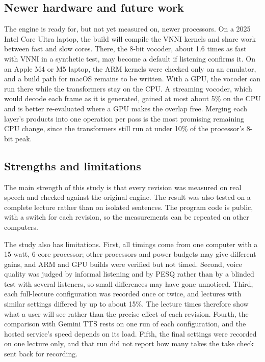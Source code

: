 \documentclass[11pt]{article}
\begin{document}
\hypertarget{newer-hardware-and-future-work}{%
\subsection{Newer hardware and future
work}\label{newer-hardware-and-future-work}}

The engine is ready for, but not yet measured on, newer processors. On a
2025 Intel Core Ultra laptop, the build will compile the VNNI kernels
and share work between fast and slow cores. There, the 8-bit vocoder,
about 1.6 times as fast with VNNI in a synthetic test, may become a
default if listening confirms it. On an Apple M4 or M5 laptop, the ARM
kernels were checked only on an emulator, and a build path for macOS
remains to be written. With a GPU, the vocoder can run there while the
transformers stay on the CPU. A streaming vocoder, which would decode
each frame as it is generated, gained at most about 5\% on the CPU and
is better re-evaluated where a GPU makes the overlap free. Merging each
layer's products into one operation per pass is the most promising
remaining CPU change, since the transformers still run at under 10\% of
the processor's 8-bit peak.

\hypertarget{strengths-and-limitations}{%
\subsection{Strengths and limitations}\label{strengths-and-limitations}}

The main strength of this study is that every revision was measured on
real speech and checked against the original engine. The result was also
tested on a complete lecture rather than on isolated sentences. The
program code is public, with a switch for each revision, so the
measurements can be repeated on other computers.

The study also has limitations. First, all timings come from one
computer with a 15-watt, 6-core processor; other processors and power
budgets may give different gains, and ARM and GPU builds were verified
but not timed. Second, voice quality was judged by informal listening
and by PESQ rather than by a blinded test with several listeners, so
small differences may have gone unnoticed. Third, each full-lecture
configuration was recorded once or twice, and lectures with similar
settings differed by up to about 15\%. The lecture times therefore show
what a user will see rather than the precise effect of each revision.
Fourth, the comparison with Gemini TTS rests on one run of each
configuration, and the hosted service's speed depends on its load.
Fifth, the final settings were recorded on one lecture only, and that
run did not report how many takes the take check sent back for
recording.
\end{document}
